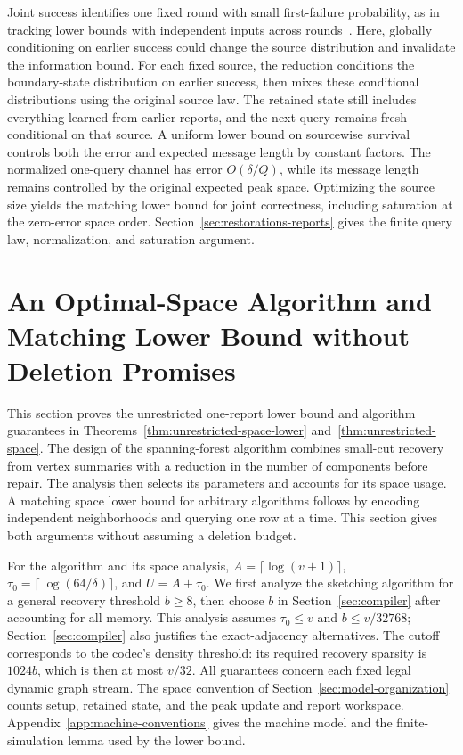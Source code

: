 \documentclass[11pt,letterpaper]{article}
\numberwithin{equation}{section}
\begin{document}
Joint success identifies one fixed round with small first-failure probability, as in tracking lower bounds with independent inputs across rounds~\cite[Section~7 of the full version]{Blasiok2018}.
Here, globally conditioning on earlier success could change the source distribution and invalidate the information bound.
For each fixed source, the reduction conditions the boundary-state distribution on earlier success, then mixes these conditional distributions using the original source law.
The retained state still includes everything learned from earlier reports, and the next query remains fresh conditional on that source.
A uniform lower bound on sourcewise survival controls both the error and expected message length by constant factors.
The normalized one-query channel has error $O(\delta/Q)$, while its message length remains controlled by the original expected peak space.
Optimizing the source size yields the matching lower bound for joint correctness, including saturation at the zero-error space order.
Section~\ref{sec:restorations-reports} gives the finite query law, normalization, and saturation argument.

\section{An Optimal-Space Algorithm and Matching Lower Bound without Deletion Promises}
\label{sec:unrestricted-proof}

This section proves the unrestricted one-report lower bound and algorithm guarantees in Theorems~\ref{thm:unrestricted-space-lower} and~\ref{thm:unrestricted-space}.
The design of the spanning-forest algorithm combines small-cut recovery from vertex summaries with a reduction in the number of components before repair.
The analysis then selects its parameters and accounts for its space usage.
A matching space lower bound for arbitrary algorithms follows by encoding independent neighborhoods and querying one row at a time.
This section gives both arguments without assuming a deletion budget.

For the algorithm and its space analysis, $A=\lceil\log(v+1)\rceil$, $\tau_0=\lceil\log(64/\delta)\rceil$, and $U=A+\tau_0$.
We first analyze the sketching algorithm for a general recovery threshold $b\ge8$, then choose $b$ in Section~\ref{sec:compiler} after accounting for all memory.
This analysis assumes $\tau_0\le v$ and $b\le v/32768$; Section~\ref{sec:compiler} also justifies the exact-adjacency alternatives.
The cutoff corresponds to the codec's density threshold: its required recovery sparsity is $1024b$, which is then at most $v/32$.
All guarantees concern each fixed legal dynamic graph stream.
The space convention of Section~\ref{sec:model-organization} counts setup, retained state, and the peak update and report workspace.
Appendix~\ref{app:machine-conventions} gives the machine model and the finite-simulation lemma used by the lower bound.
\end{document}
